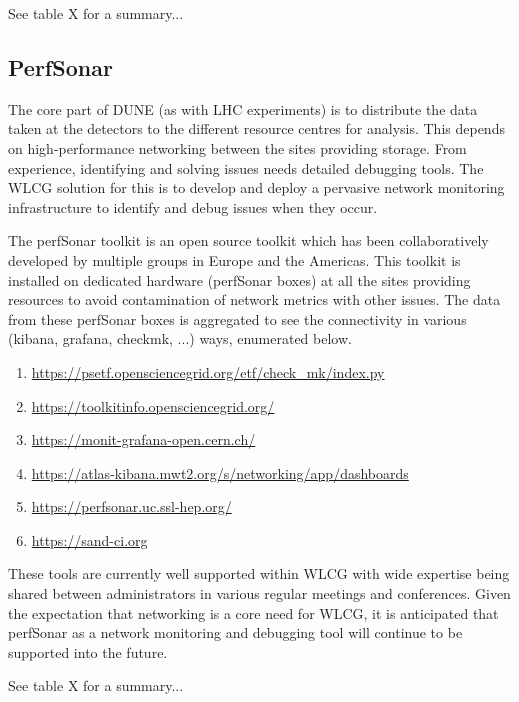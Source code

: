 See table X for a summary... 

\subsection{PerfSonar}

The core part of DUNE (as with LHC experiments) is to distribute the data taken at the detectors to the different resource centres for analysis. This depends on high-performance networking between the sites providing storage. From experience, identifying and solving issues needs detailed debugging tools. The WLCG solution for this is to develop and deploy a pervasive network monitoring infrastructure to identify and debug issues when they occur.

The perfSonar toolkit is an open source toolkit which has been collaboratively developed by multiple groups in Europe and the Americas. This toolkit is installed on dedicated hardware (perfSonar boxes) at all the sites providing resources to avoid contamination of network metrics with other issues. The data from these perfSonar boxes is aggregated to see the connectivity in various (kibana, grafana, checkmk, ...) ways, enumerated below.

\begin{enumerate}
    \item \url{https://psetf.opensciencegrid.org/etf/check_mk/index.py}
    \item \url{https://toolkitinfo.opensciencegrid.org/}
    \item \url{https://monit-grafana-open.cern.ch/}
    \item \url{https://atlas-kibana.mwt2.org/s/networking/app/dashboards}
    \item \url{https://perfsonar.uc.ssl-hep.org/}
    \item \url{https://sand-ci.org}
\end{enumerate}

These tools are currently well supported within WLCG with wide expertise being shared between administrators in various regular meetings and conferences. Given the expectation that networking is a core need for WLCG, it is anticipated that perfSonar as a network monitoring and debugging tool will continue to be supported into the future.

See table X for a summary... 


